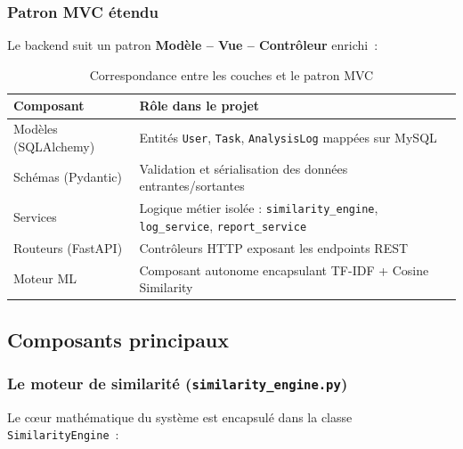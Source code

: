 \documentclass[12pt, a4paper]{article}
\begin{document}
\subsubsection{Patron MVC étendu}

Le backend suit un patron \textbf{Modèle -- Vue -- Contrôleur} enrichi~:

\begin{table}[H]
\centering
\caption{Correspondance entre les couches et le patron MVC}
\begin{tabularx}{\textwidth}{lX}
\toprule
\rowcolor{tablehead}
\color{white}\textbf{Composant} & \color{white}\textbf{Rôle dans le projet} \\
\midrule
\rowcolor{tablegray}
Modèles (SQLAlchemy) & Entités \texttt{User}, \texttt{Task}, \texttt{AnalysisLog} mappées sur MySQL \\
Schémas (Pydantic)   & Validation et sérialisation des données entrantes/sortantes \\
\rowcolor{tablegray}
Services             & Logique métier isolée : \texttt{similarity\_engine}, \texttt{log\_service}, \texttt{report\_service} \\
Routeurs (FastAPI)   & Contrôleurs HTTP exposant les endpoints REST \\
\rowcolor{tablegray}
Moteur ML            & Composant autonome encapsulant TF-IDF + Cosine Similarity \\
\bottomrule
\end{tabularx}
\end{table}

\subsection{Composants principaux}

\subsubsection{Le moteur de similarité (\texttt{similarity\_engine.py})}

Le cœur mathématique du système est encapsulé dans la classe \texttt{SimilarityEngine}~:
\end{document}
